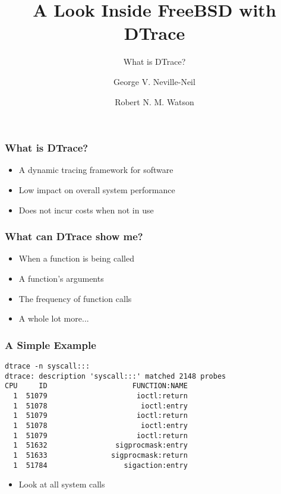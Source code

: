 \documentclass[pdftex]{beamer}
\begin{document}

\title{A Look Inside FreeBSD with DTrace}
\subtitle{What is DTrace?}
\author[shortname]{George V. Neville-Neil \and Robert N. M. Watson}

\begin{frame}
  \titlepage
\end{frame}

\begin{frame}
  \frametitle{What is DTrace?}
  \begin{itemize}
  \item A dynamic tracing framework for software
  \item Low impact on overall system performance
  \item Does not incur costs when not in use
  \end{itemize}
\end{frame}

\begin{frame}
  \frametitle{What can DTrace show me?}
  \begin{itemize}
  \item When a function is being called
  \item A function's arguments
  \item The frequency of function calls
  \item A whole lot more...
  \end{itemize}
\end{frame}

\begin{frame}[fragile]
  \frametitle{A Simple Example}
  \begin{lstlisting}
dtrace -n syscall:::
dtrace: description 'syscall:::' matched 2148 probes
CPU     ID                    FUNCTION:NAME
  1  51079                     ioctl:return 
  1  51078                      ioctl:entry 
  1  51079                     ioctl:return 
  1  51078                      ioctl:entry 
  1  51079                     ioctl:return 
  1  51632                sigprocmask:entry 
  1  51633               sigprocmask:return 
  1  51784                  sigaction:entry 
  \end{lstlisting}
  \begin{itemize}
  \item Look at all system calls
  \end{itemize}
\end{frame}
\end{document}
